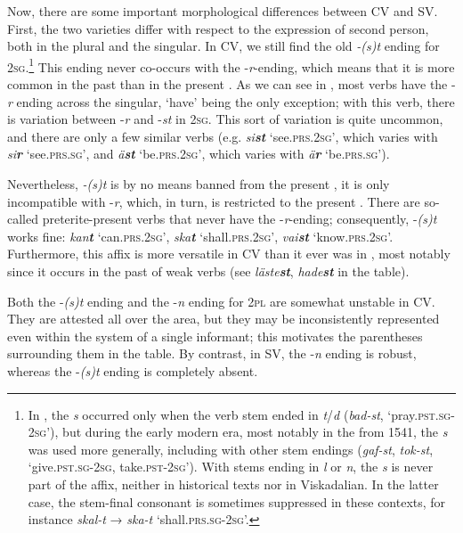 \documentclass[output=paper,colorlinks,citecolor=brown,draft,draftmode]{langscibook}
\begin{document}
Now, there are some important morphological differences between CV and SV. First, the two varieties differ with respect to the expression of second person, both in the plural and the singular. In CV, we still find the old \textit{-(s)t} ending for 2\textsc{sg}.\footnote{In , the \textit{s} occurred only when the verb stem ended in \textit{t}/\textit{d} (\textit{bad-st}, ‘pray.\textsc{pst.sg}-\textsc{2sg}’), but during the early modern era, most notably in the  from 1541, the \textit{s} was used more generally, including with other stem endings (\textit{gaf-st}, \textit{tok-st}, ‘give.\textsc{pst.sg}-2\textsc{sg}, take.\textsc{pst}-\textsc{2sg}’). With stems ending in \textit{l} or \textit{n}, the \textit{s} is never part of the affix, neither in historical texts nor in Viskadalian. In the latter case, the stem-final consonant is sometimes suppressed in these contexts, for instance \textit{skal-t} → \textit{ska-t} ‘shall.\textsc{prs.sg}-2\textsc{sg}’.} This ending never co-occurs with the -\textit{r}-ending, which means that it is more common in the past than in the present . As we can see in , most verbs have the -\textit{r} ending across the singular, ‘have’ being the only exception; with this verb, there is variation between -\textit{r} and -\textit{st} in 2\textsc{sg}. This sort of variation is quite uncommon, and there are only a few similar verbs (e.g. \textit{si\textbf{{st}}} ‘see.\textsc{prs}.2\textsc{sg}’, which varies with \textit{si\textbf{{r}}} ‘see.\textsc{prs}.\textsc{sg}’, and \textit{ä\textbf{{st}}} ‘be.\textsc{prs.}2\textsc{sg}’, which varies with \textit{ä\textbf{{r}}} ‘be.\textsc{prs}.\textsc{sg}’).



Nevertheless, \textit{-(s)t} is by no means banned from the present , it is only incompatible with -\textit{r}, which, in turn, is restricted to the present . There are so-called preterite-present verbs that never have the -\textit{r}-ending; consequently, \mbox{-\textit{(s)t}} works fine: \textit{kan\textbf{{t}}} ‘can.\textsc{prs}.2\textsc{sg}’, \textit{ska\textbf{{t}}} ‘shall.\textsc{prs}.2\textsc{sg}’, \textit{vai\textbf{{st}}} ‘know.\textsc{prs.}2\textsc{sg}’. Furthermore, this affix is more versatile in CV than it ever was in , most notably since it occurs in the past  of weak verbs (see \textit{läste\textbf{{st}}}, \textit{hade\textbf{{st}}} in the table).



Both the -\textit{(s)t} ending and the -\textit{n} ending for 2\textsc{pl} are somewhat unstable in CV. They are attested all over the area, but they may be inconsistently represented even within the system of a single informant; this motivates the parentheses surrounding them in the table. By contrast, in SV, the -\textit{n} ending is robust, whereas the -\textit{(s)t} ending is completely absent.
\end{document}
